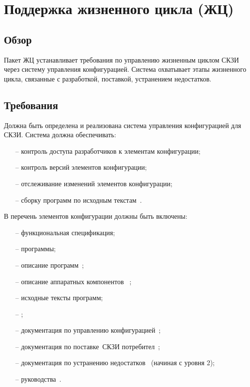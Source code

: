 \section{Поддержка жизненного цикла (ЖЦ)}\label{LC}

\subsection{Обзор}\label{LC.Intro}

Пакет ЖЦ устанавливает требования по управлению жизненным циклом СКЗИ
через систему управления конфигурацией. Система охватывает этапы жизненного 
цикла, связанные с разработкой, поставкой, устранением недостатков.

\subsection{Требования}\label{LC.Reqs}

\label{R.LC.CMSystem}
Должна быть определена и реализована система управления конфигурацией для СКЗИ.
Система должна обеспечивать:
\begin{itemize}
\item[--]
контроль доступа разработчиков к элементам конфигурации;
\item[--]
контроль версий элементов конфигурации;
\item[--]
отслеживание изменений элементов конфигурации;
\item[--]
сборку программ по исходным текстам~.
\end{itemize}

\label{R.LC.CMList}
В перечень элементов конфигурации должны быть включены:
\begin{itemize}
\item[--]
функциональная спецификация;
\item[--]
программы;
\item[--]
описание программ~;
\item[--]
описание аппаратных компонентов~
;
\item[--]
исходные тексты программ;
\item[--]
;
\item[--]
документация по управлению конфигурацией~;
\item[--]
документация по поставке~СКЗИ потребител~;
\item[--]
документация по устранению недостатков~
(начиная с уровня 2);
\item[--]
руководства~.
\end{itemize}

